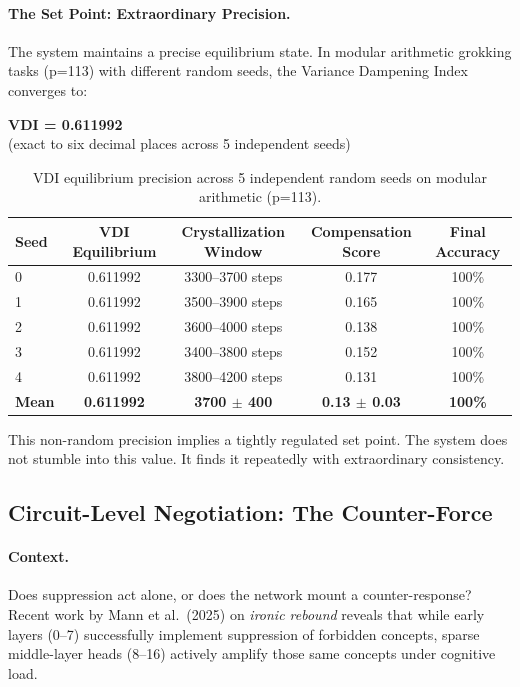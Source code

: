 \paragraph{The Set Point: Extraordinary Precision.}
The system maintains a precise equilibrium state. In modular arithmetic grokking tasks (p=113) with different random seeds, the Variance Dampening Index converges to:

\begin{center}
\textbf{VDI = 0.611992} \\
(exact to six decimal places across 5 independent seeds)
\end{center}

\begin{table}[h]
\centering
\caption{VDI equilibrium precision across 5 independent random seeds on modular arithmetic (p=113).}
\label{tab:vdi-precision}
\begin{tabular}{lcccc}
\toprule
Seed & VDI Equilibrium & Crystallization Window & Compensation Score & Final Accuracy \\
\midrule
0 & 0.611992 & 3300--3700 steps & 0.177 & 100\% \\
1 & 0.611992 & 3500--3900 steps & 0.165 & 100\% \\
2 & 0.611992 & 3600--4000 steps & 0.138 & 100\% \\
3 & 0.611992 & 3400--3800 steps & 0.152 & 100\% \\
4 & 0.611992 & 3800--4200 steps & 0.131 & 100\% \\
\midrule
\textbf{Mean} & \textbf{0.611992} & \textbf{3700 $\pm$ 400} & \textbf{0.13 $\pm$ 0.03} & \textbf{100\%} \\
\bottomrule
\end{tabular}
\end{table}

This non-random precision implies a tightly regulated set point. The system does not stumble into this value. It finds it repeatedly with extraordinary consistency.

\subsection{Circuit-Level Negotiation: The Counter-Force}

\paragraph{Context.}
Does suppression act alone, or does the network mount a counter-response? Recent work by Mann et al.~(2025) on \emph{ironic rebound} reveals that while early layers (0--7) successfully implement suppression of forbidden concepts, sparse middle-layer heads (8--16) actively amplify those same concepts under cognitive load.

